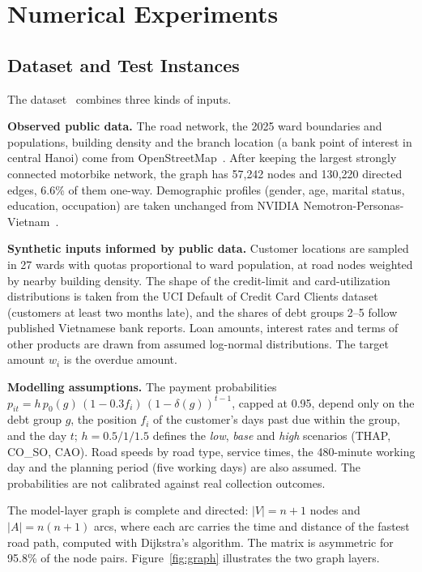 \documentclass[11pt,a4paper]{article}
\begin{document}
\section{Numerical Experiments}
\label{sec:experiments}

\subsection{Dataset and Test Instances}
The dataset~\cite{projectrepo} combines three kinds of inputs.

\textbf{Observed public data.} The road network, the 2025 ward boundaries and
populations, building density and the branch location (a bank point of
interest in central Hanoi) come from OpenStreetMap~\cite{osm}. After keeping
the largest strongly connected motorbike network, the graph has 57{,}242
nodes and 130{,}220 directed edges, 6.6\% of them one-way. Demographic
profiles (gender, age, marital status, education, occupation) are taken
unchanged from NVIDIA Nemotron-Personas-Vietnam~\cite{nemotron}.

\textbf{Synthetic inputs informed by public data.} Customer locations are
sampled in 27 wards with quotas proportional to ward population, at road
nodes weighted by nearby building density. The shape of the credit-limit and
card-utilization distributions is taken from the UCI Default of Credit Card
Clients dataset~\cite{uci2009} (customers at least two months late), and the
shares of debt groups 2--5 follow published Vietnamese bank reports. Loan
amounts, interest rates and terms of other products are drawn from assumed
log-normal distributions. The target amount $w_i$ is the overdue amount.

\textbf{Modelling assumptions.} The payment probabilities
$p_{it}=h\,p_0(g)\,(1-0.3f_i)\,(1-\delta(g))^{t-1}$, capped at 0.95, depend
only on the debt group $g$, the position $f_i$ of the customer's days past
due within the group, and the day $t$; $h=0.5/1/1.5$ defines the
\emph{low}, \emph{base} and \emph{high} scenarios (THAP, CO\_SO, CAO).
Road speeds by road type, service times, the 480-minute working day and the
planning period (five working days) are also assumed. The probabilities are
not calibrated against real collection outcomes.

The model-layer graph is complete and directed: $|V|=n+1$ nodes and
$|A|=n(n+1)$ arcs, where each arc carries the time and distance of the
fastest road path, computed with Dijkstra's algorithm. The matrix is
asymmetric for 95.8\% of the node pairs. Figure~\ref{fig:graph} illustrates
the two graph layers.
\end{document}
